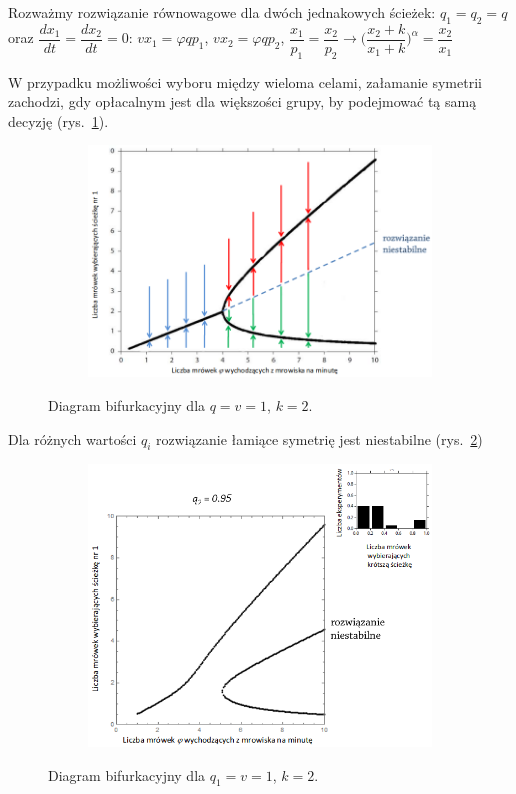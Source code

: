 Rozważmy rozwiązanie równowagowe dla dwóch jednakowych ścieżek: $ q_1 = q_2 = q $ oraz $ \dfrac{dx_1}{dt} = \dfrac{dx_2}{dt} = 0 $:\newline
$ vx_1 = \varphi q p_1 $,\newline
$ vx_2 = \varphi q p_2 $,\newline
$ \dfrac{x_1}{p_1} = \dfrac{x_2}{p_2} \rightarrow \bigg( \dfrac{x_2 + k}{x_1 + k} \bigg)^{\alpha} = \dfrac{x_2}{x_1} $

W przypadku możliwości wyboru między wieloma celami, załamanie symetrii zachodzi, gdy opłacalnym jest dla większości grupy, by podejmować tą samą decyzję (rys.~\ref{ants1}).

\begin{figure} [H]
	\centering
	\begin{subfigure}{.95\textwidth}
		\centering
		\includegraphics[width=1.0\linewidth]{EDMIIssues/Figures/ants1.png}
	\end{subfigure}
	\caption{Diagram bifurkacyjny dla $ q = v = 1 $, $ k = 2 $.}
	\label{ants1}
\end{figure}

Dla różnych wartości $ q_i $ rozwiązanie łamiące symetrię jest niestabilne (rys.~\ref{ants2})

\begin{figure} [H]
	\centering
	\begin{subfigure}{.95\textwidth}
		\centering
		\includegraphics[width=1.0\linewidth]{EDMIIssues/Figures/ants2.png}
	\end{subfigure}
	\caption{Diagram bifurkacyjny dla $ q_1 = v = 1 $, $ k = 2 $.}
	\label{ants2}
\end{figure}